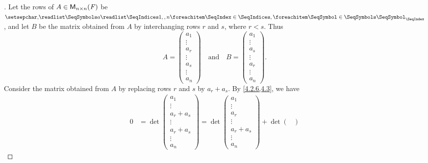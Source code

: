 \begin{proof}[]
  Let the rows of \(A \in \mathsf{M}_{{n} \times n}({\mathit{F}})\) be \(\seq{a}{1,,n}\), and let \(B\) be the matrix obtained from \(A\) by interchanging rows \(r\) and \(s\), where \(r < s\).
  Thus
  \[
    A = \begin{pmatrix}
      a_1    \\
      \vdots \\
      a_r    \\
      \vdots \\
      a_s    \\
      \vdots \\
      a_n
    \end{pmatrix} \quad \text{and} \quad B = \begin{pmatrix}
      a_1    \\
      \vdots \\
      a_s    \\
      \vdots \\
      a_r    \\
      \vdots \\
      a_n
    \end{pmatrix}.
  \]
  Consider the matrix obtained from \(A\) by replacing rows \(r\) and \(s\) by \(a_r + a_s\).
  By \cref{4.2.6,4.3}, we have
  \begin{align*}
    0 & = \det\begin{pmatrix}
                a_1       \\
                \vdots    \\
                a_r + a_s \\
                \vdots    \\
                a_r + a_s \\
                \vdots    \\
                a_n
              \end{pmatrix} = \det\begin{pmatrix}
                                    a_1       \\
                                    \vdots    \\
                                    a_r       \\
                                    \vdots    \\
                                    a_r + a_s \\
                                    \vdots    \\
                                    a_n
                                  \end{pmatrix} + \det\begin{pmatrix}

\end{pmatrix}
\end{align*}
\end{proof}
